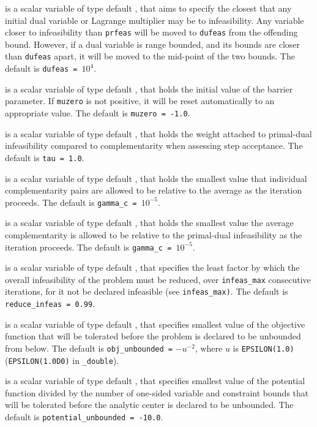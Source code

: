 \begin{description}
 is a scalar variable of type default \realdp, that aims to specify
the closest that any initial dual variable or Lagrange multiplier may be to
infeasibility. Any variable closer to infeasibility than {\tt prfeas} will be
moved to {\tt dufeas} from the offending bound. However, if a dual variable
is range bounded, and its bounds are closer than {\tt dufeas} apart, it will
be moved to the mid-point of the two bounds.
The default is {\tt dufeas = $10^4$}.

  is a scalar variable of type default \realdp, that holds the
initial value of the barrier parameter. If {\tt muzero} is
not positive, it will be reset automatically to an appropriate value.
The default is {\tt muzero = -1.0}.

  is a scalar variable of type default \realdp, that holds the
weight attached to primal-dual infeasibility compared to complementarity
when assessing step acceptance.
The default is {\tt tau = 1.0}.

  is a scalar variable of type default \realdp, that holds the
smallest value that individual complementarity pairs are allowed
to be relative to the average as the iteration proceeds.
The default is {\tt gamma\_c = $10^{-5}$}.

  is a scalar variable of type default \realdp, that holds the
smallest value the average complementarity is allowed
to be relative to the primal-dual infeasibility as the iteration proceeds.
The default is {\tt gamma\_c = $10^{-5}$}.

  is a scalar variable of type default
\realdp, that specifies the
least factor by which the overall infeasibility of the problem must be reduced,
over {\tt infeas\_max} consecutive iterations,
for it not be declared infeasible (see {\tt infeas\_max)}.
The default is {\tt reduce\_infeas = 0.99}.

  is a scalar variable of type default
\realdp, that specifies smallest
value of the objective function that will be tolerated before the problem
is declared to be unbounded from below.
The default is {\tt obj\_u\-nbounded =} $-u^{-2}$,
where $u$ is {\tt EPSILON(1.0)} ({\tt EPSILON(1.0D0)} in
{\tt \fullpackagename\_double}).

  is a scalar variable of type default
\realdp, that specifies smallest
value of the potential function divided by the number of one-sided variable and
constraint bounds that will be tolerated before the analytic center is
declared to be unbounded.
The default is {\tt potential\_u\-nbounded = -10.0}.


\end{description}
